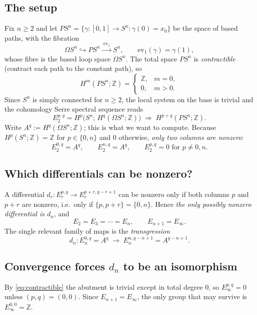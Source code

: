 \documentclass[11pt]{article}
\theoremstyle{definition}
\newcommand{\Z}{\mathbb{Z}}
\begin{document}
\subsection{The setup}

Fix $n\ge 2$ and let $PS^n=\{\gamma\colon[0,1]\to S^n : \gamma(0)=x_0\}$ be the
space of based paths, with the fibration
\[
  \Omega S^n \hookrightarrow PS^n \xrightarrow{\ \mathrm{ev}_1\ } S^n,
  \qquad \mathrm{ev}_1(\gamma)=\gamma(1),
\]
whose fibre is the based loop space $\Omega S^n$. The total space $PS^n$ is
\emph{contractible} (contract each path to the constant path), so
\begin{equation}\label{eq:contractible}
  H^m(PS^n;\Z)=\begin{cases}\Z,& m=0,\\ 0,&m>0.\end{cases}
\end{equation}
Since $S^n$ is simply connected for $n\ge 2$, the local system on the base is
trivial and the cohomology Serre spectral sequence reads
\[
  E_2^{p,q}=H^p\!\big(S^n;\,H^q(\Omega S^n;\Z)\big)
  \;\Longrightarrow\; H^{p+q}(PS^n;\Z).
\]
Write $A^q:=H^q(\Omega S^n;\Z)$; this is what we want to compute. Because
$H^p(S^n;\Z)=\Z$ for $p\in\{0,n\}$ and $0$ otherwise, \emph{only two columns are
nonzero}:
\[
  E_2^{0,q}=A^q,\qquad E_2^{n,q}=A^q,\qquad E_2^{p,q}=0 \text{ for } p\neq 0,n.
\]

\subsection{Which differentials can be nonzero?}

A differential $d_r\colon E_r^{p,q}\to E_r^{p+r,q-r+1}$ can be nonzero only if
both columns $p$ and $p+r$ are nonzero, i.e.\ only if $\{p,p+r\}=\{0,n\}$. Hence
\emph{the only possibly nonzero differential is $d_n$}, and
\[
  E_2=E_3=\cdots=E_n,\qquad E_{n+1}=E_\infty .
\]
The single relevant family of maps is the \emph{transgression}
\[
  d_n\colon E_n^{0,q}=A^{q}\;\to\;E_n^{n,q-n+1}=A^{q-n+1}.
\]

\subsection{Convergence forces $d_n$ to be an isomorphism}

By \eqref{eq:contractible} the abutment is trivial except in total degree $0$, so
$E_\infty^{p,q}=0$ unless $(p,q)=(0,0)$. Since $E_{n+1}=E_\infty$, the only
group that may survive is $E_\infty^{0,0}=\Z$.
\end{document}
